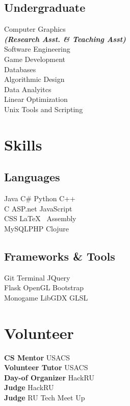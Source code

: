 \documentclass[]{deedy-resume-openfont}
\begin{document}
\begin{minipage}[t]{0.33\textwidth}
\subsection{Undergraduate}
Computer Graphics \\
{\footnotesize \textit{\textbf{(Research Asst. \& Teaching Asst) }}} \\
Software Engineering \\
Game Development \\
Databases \\
Algorithmic Design \\
Data Analyitcs \\
Linear Optimization \\  
Unix Tools and Scripting \\
\sectionsep


\section{Skills}
\subsection{Languages}
Java \textbullet{} C\# \textbullet{} Python \textbullet{} C++ \\
C\textbullet{} ASP.net \textbullet{} JavaScript \\ 
CSS \textbullet{} \LaTeX\ \textbullet{} Assembly \\
MySQL\textbullet{}PHP \textbullet{}Clojure\\
\sectionsep
\sectionsep
\subsection{Frameworks \& Tools}
Git \textbullet{}  Terminal \textbullet{} JQuery\\
Flask\textbullet{} OpenGL\textbullet{} Bootstrap \\ 
Monogame \textbullet{} LibGDX \textbullet{} GLSL
\sectionsep


\section{Volunteer}
\textbf{CS Mentor}  \textbullet{} USACS \\ 
\textbf{Volunteer Tutor} \textbullet{} USACS \\ 
\textbf{Day-of Organizer} \textbullet{} HackRU \\
\textbf{Judge} \textbullet{} HackRU \\
\textbf{Judge} \textbullet{} RU Tech Meet Up \\

\sectionsep


%
%

\end{minipage} 
\end{document}
